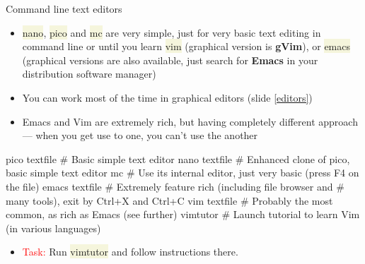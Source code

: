 \documentclass[compress, xelatex, 11pt, xcolor=svgnames, aspectratio=169, url={hyphens, lowtilde}]{beamer}
\renewcommand{\texttt}[1]{\colorbox{Beige}{{\ttfamily #1}}}
\renewcommand{\alert}[1]{\textcolor{red}{#1}}
\begin{document}
\begin{frame}[fragile]{Command line text editors}
	\begin{itemize}
		\item \texttt{nano}, \texttt{pico} and \texttt{mc} are very simple, just for very basic text editing in command line or until you learn \texttt{vim} (graphical version is \textbf{gVim}), or \texttt{emacs} (graphical versions are also available, just search for \textbf{Emacs} in your distribution software manager)
		\item You can work most of the time in graphical editors (slide \ref{editors})
		\item Emacs and Vim are extremely rich, but having completely different approach --- when you get use to one, you can't use the another
	\end{itemize}
	\vfill
	\begin{bashcode}
    pico textfile # Basic simple text editor
    nano textfile # Enhanced clone of pico, basic simple text editor
    mc # Use its internal editor, just very basic (press F4 on the file)
    emacs textfile # Extremely feature rich (including file browser and
                   # many tools), exit by Ctrl+X and Ctrl+C
    vim textfile # Probably the most common, as rich as Emacs (see further)
    vimtutor # Launch tutorial to learn Vim (in various languages)
	\end{bashcode}
	\vfill
	\begin{itemize}
		\item \alert{Task:} Run \texttt{vimtutor} and follow instructions there.
	\end{itemize}
\end{frame}
\end{document}
